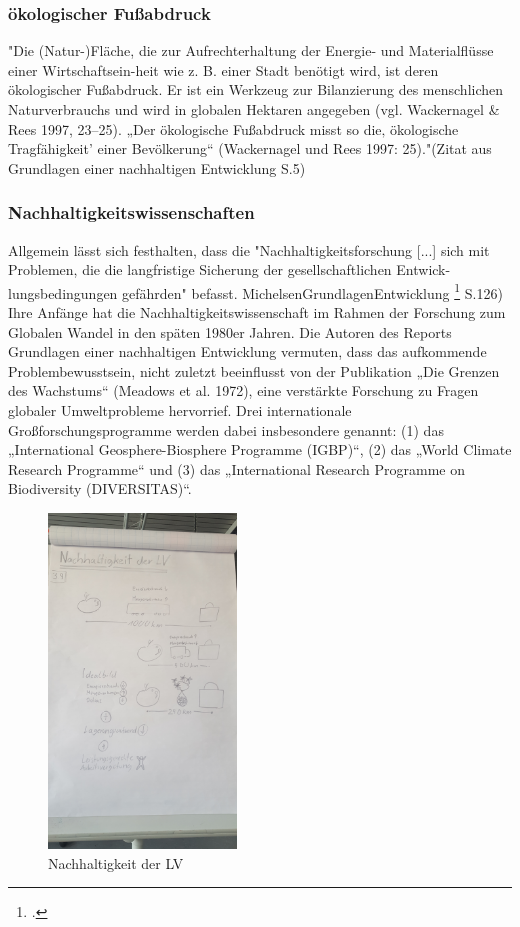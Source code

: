 \documentclass{article}
\begin{document}
\subsubsection{ökologischer Fußabdruck}
"Die (Natur-)Fläche, die zur Aufrechterhaltung der Energie- und Materialflüsse einer Wirtschaftsein-heit wie z. B. einer Stadt benötigt wird, ist deren ökologischer Fußabdruck. Er ist ein Werkzeug zur Bilanzierung des menschlichen Naturverbrauchs und wird in globalen Hektaren angegeben (vgl. Wackernagel & Rees 1997, 23–25). „Der ökologische Fußabdruck misst so die‚ ökologische Tragfähigkeit’ einer Bevölkerung“ (Wackernagel und Rees 1997: 25)."(Zitat aus Grundlagen einer nachhaltigen Entwicklung S.5)

\subsubsection{Nachhaltigkeitswissenschaften}
Allgemein lässt sich festhalten, dass die "Nachhaltigkeitsforschung [...] sich mit Problemen, die die langfristige Sicherung der gesellschaftlichen Entwick-lungsbedingungen gefährden" befasst. MichelsenGrundlagenEntwicklung \footcite{Grundlagen einer nachhaltigen Entwicklung} S.126)
Ihre Anfänge hat die Nachhaltigkeitswissenschaft im Rahmen der Forschung zum Globalen Wandel in den späten 1980er Jahren. Die Autoren des Reports Grundlagen einer nachhaltigen Entwicklung vermuten, dass das aufkommende Problembewusstsein, nicht zuletzt beeinflusst von der Publikation „Die Grenzen des Wachstums“ (Meadows et al. 1972), eine verstärkte Forschung zu Fragen globaler Umweltprobleme hervorrief.
Drei internationale Großforschungsprogramme werden dabei insbesondere genannt: (1) das „International Geosphere-Biosphere Programme (IGBP)“, (2) das „World Climate Research Programme“ und (3) das
„International Research Programme on Biodiversity (DIVERSITAS)“.


\begin{figure}[htp]
\centering
\includegraphics[width=5cm]{image_folder/skizze1.jpg}
\caption{Nachhaltigkeit der LV}
\label{fig:Skizze_Nachhaltigkeit}
\end{figure}
\end{document}
